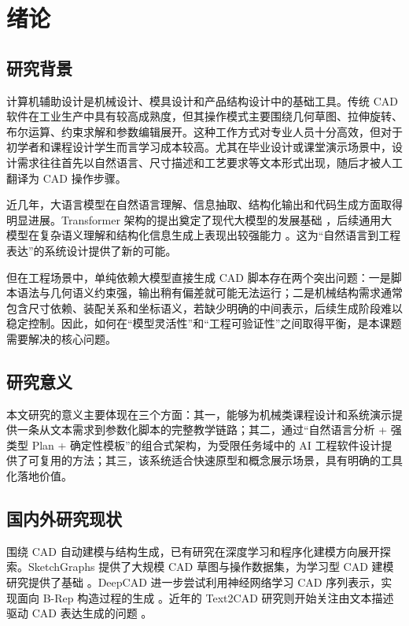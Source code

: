 \section{绪论}

\subsection{研究背景}

计算机辅助设计是机械设计、模具设计和产品结构设计中的基础工具。传统 CAD 软件在工业生产中具有较高成熟度，但其操作模式主要围绕几何草图、拉伸旋转、布尔运算、约束求解和参数编辑展开。这种工作方式对专业人员十分高效，但对于初学者和课程设计学生而言学习成本较高。尤其在毕业设计或课堂演示场景中，设计需求往往首先以自然语言、尺寸描述和工艺要求等文本形式出现，随后才被人工翻译为 CAD 操作步骤。

近几年，大语言模型在自然语言理解、信息抽取、结构化输出和代码生成方面取得明显进展。Transformer 架构的提出奠定了现代大模型的发展基础 \cite{vaswani2017attention}，后续通用大模型在复杂语义理解和结构化信息生成上表现出较强能力 \cite{openai2023gpt4}。这为“自然语言到工程表达”的系统设计提供了新的可能。

但在工程场景中，单纯依赖大模型直接生成 CAD 脚本存在两个突出问题：一是脚本语法与几何语义约束强，输出稍有偏差就可能无法运行；二是机械结构需求通常包含尺寸依赖、装配关系和坐标语义，若缺少明确的中间表示，后续生成阶段难以稳定控制。因此，如何在“模型灵活性”和“工程可验证性”之间取得平衡，是本课题需要解决的核心问题。

\subsection{研究意义}

本文研究的意义主要体现在三个方面：其一，能够为机械类课程设计和系统演示提供一条从文本需求到参数化脚本的完整教学链路；其二，通过“自然语言分析 + 强类型 Plan + 确定性模板”的组合式架构，为受限任务域中的 AI 工程软件设计提供了可复用的方法；其三，该系统适合快速原型和概念展示场景，具有明确的工具化落地价值。

\subsection{国内外研究现状}

围绕 CAD 自动建模与结构生成，已有研究在深度学习和程序化建模方向展开探索。SketchGraphs 提供了大规模 CAD 草图与操作数据集，为学习型 CAD 建模研究提供了基础 \cite{seff2020sketchgraphs}。DeepCAD 进一步尝试利用神经网络学习 CAD 序列表示，实现面向 B-Rep 构造过程的生成 \cite{wu2021deepcad}。近年的 Text2CAD 研究则开始关注由文本描述驱动 CAD 表达生成的问题 \cite{khan2024text2cad}。

